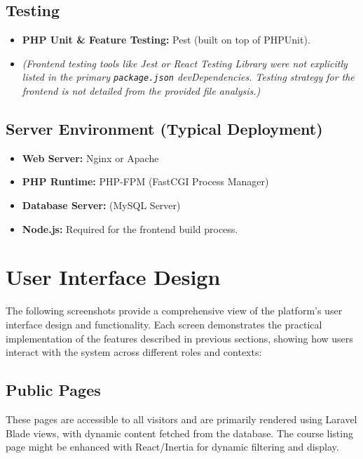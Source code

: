 \documentclass[12pt,a4paper]{article}
\begin{document}
\subsection*{Testing}

\begin{itemize}
    \item \textbf{PHP Unit \& Feature Testing:} Pest (built on top of PHPUnit).
    \item \textit{(Frontend testing tools like Jest or React Testing Library were not explicitly listed in the primary \texttt{package.json} devDependencies. Testing strategy for the frontend is not detailed from the provided file analysis.)}
\end{itemize}

\subsection*{Server Environment (Typical Deployment)}

\begin{itemize}
    \item \textbf{Web Server:} Nginx or Apache
    \item \textbf{PHP Runtime:} PHP-FPM (FastCGI Process Manager)
    \item \textbf{Database Server:} (MySQL Server)
    \item \textbf{Node.js:} Required for the frontend build process.
\end{itemize}

\section{User Interface Design}

The following screenshots provide a comprehensive view of the platform's user interface design and functionality. Each screen demonstrates the practical implementation of the features described in previous sections, showing how users interact with the system across different roles and contexts:

\subsection{Public Pages}

These pages are accessible to all visitors and are primarily rendered using Laravel Blade views, with dynamic content fetched from the database. The course listing page might be enhanced with React/Inertia for dynamic filtering and display.
\end{document}
